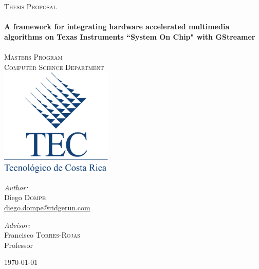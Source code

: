 \begin{titlepage}
 
\begin{center}
 
\textsc{\LARGE Thesis Proposal}\\[0.5cm]
 
\HRule \\[0.4cm]
{  \huge \bfseries A framework for integrating hardware accelerated multimedia algorithms on Texas Instruments ``System On Chip" with GStreamer}
\\[0.4cm]
 
\HRule \\[0.4cm]

\textsc{\LARGE Masters Program}\\[0.2cm]
\textsc{\large Computer Science Department}\\[0.2cm]
\includegraphics[width=0.4\textwidth]{../Common/Images/logoTec}\\[1.2cm]

 
\begin{minipage}{0.45\textwidth}
\begin{flushleft} \large
\emph{Author:}\\
Diego \textsc{Dompe}\\
\href{mailto:diego.dompe@ridgerun.com}{diego.dompe@ridgerun.com}
\end{flushleft}
\end{minipage}
\begin{minipage}{0.45\textwidth}
\begin{flushright} \large
\emph{Advisor:}\\
Francisco \textsc{Torres-Rojas}\\
Professor
\end{flushright}
\end{minipage}
 
 
\vfill
 
{\large \today}
 \end{center}
 \end{titlepage}
